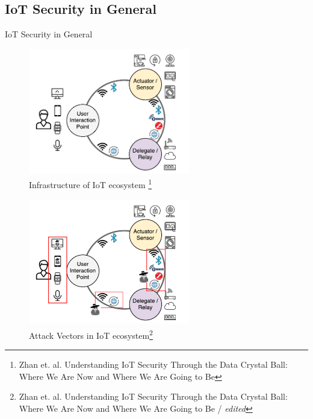 \documentclass[11pt,t,usepdftitle=false,aspectratio=169]{beamer}
\begin{document}
\subsection{IoT Security in General} %
\label{sub:general_security}
\begin{frame}{IoT Security in General} %
	\only<1>
	{
		\begin{figure}
			\centering
			\includegraphics[height=5.5cm,keepaspectratio]{img/iot_ecosystem.png}
			\caption{\small{Infrastructure of IoT ecosystem} \footnote[frame]{\tiny{Zhan et. al. Understanding IoT Security Through the Data Crystal Ball: Where We Are Now and Where We Are Going to Be}}}
		\end{figure}
		
	}
	{
		\begin{figure}
			\centering
			\includegraphics[height=5.5cm, keepaspectratio]{img/iot-ecosystem_attack-vectors.png}
			\caption{\small{Attack Vectors in IoT ecosystem}\setcounter{footnote}{1}\footnote[frame]{\tiny{Zhan et. al. Understanding IoT Security Through the Data Crystal Ball: Where We Are Now and Where We Are Going to Be / \textit{edited}}}}
		\end{figure}
	}
\end{frame}
\end{document}
